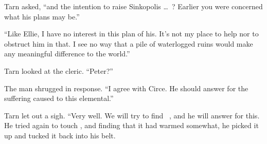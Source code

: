 Tarn asked, ``and the intention to raise Sinkopolis \ldots\ \valdunmir?  Earlier you were concerned what his plans may be.''

``Like Ellie, I have no interest in this plan of his.  It's not my place to help nor to obstruct him in that.  I see no way that a pile of waterlogged ruins would make any meaningful difference to the world.''

Tarn looked at the cleric.  ``Peter?''

The man shrugged in response.  ``I agree with Circe.  He should answer for the suffering caused to this elemental.''

Tarn let out a sigh.  ``Very well.  We will try to find \mothzam\ \driktur, and he will answer for this.  He tried again to touch \kildir, and finding that it had warmed somewhat, he picked it up and tucked it back into his belt.


















